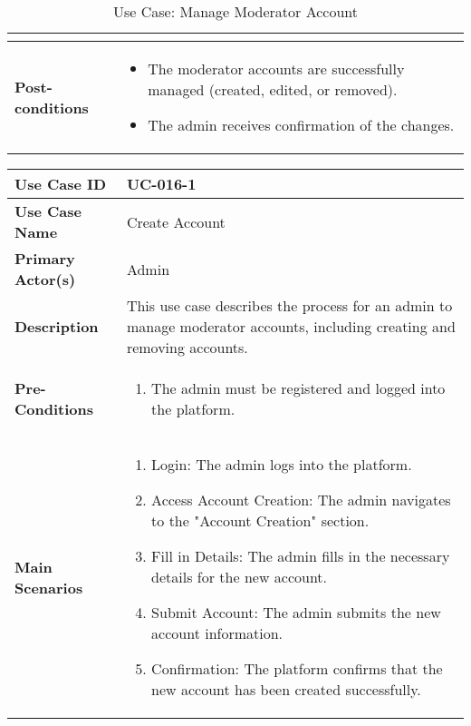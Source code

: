 \begin{table}[!ht]
\begin{tabularx}{\textwidth}{|l|X|}
\begin{itemize}[label=--,itemsep=0pt]
        \end{itemize} \\
        \hline
        \textbf{Post-conditions} & 
        \begin{itemize}[label=--,itemsep=0pt]
            \item The moderator accounts are successfully managed (created, edited, or removed).
            \item The admin receives confirmation of the changes.
        \end{itemize} \\
        \hline
    \end{tabularx}
    \caption{Use Case: Manage Moderator Account}
    \label{tab:use-case-register}
\end{table}


\begin{table}[!ht]
    \centering
    \renewcommand{\arraystretch}{1.3} %
    \begin{tabularx}{\textwidth}{|l|X|}
        \hline
        \textbf{Use Case ID} & UC-016-1 \\
        \hline
        \textbf{Use Case Name} & Create Account \\
        \hline
        \textbf{Primary Actor(s)} & Admin \\
        \hline
        \textbf{Description} & This use case describes the process for an admin to manage moderator accounts, including creating and removing accounts. \\
        \hline
        \textbf{Pre-Conditions} & 
        \begin{enumerate}[label=\arabic*.,itemsep=0pt]
            \item The admin must be registered and logged into the platform.
        \end{enumerate} \\
        \hline
        \textbf{Main Scenarios} & 
        \begin{enumerate}[label=\arabic*.,itemsep=0pt]
            \item Login: The admin logs into the platform.
            \item Access Account Creation: The admin navigates to the "Account Creation" section.
            \item Fill in Details: The admin fills in the necessary details for the new account.
            \item Submit Account: The admin submits the new account information.
            \item Confirmation: The platform confirms that the new account has been created successfully.

\end{enumerate}
\end{tabularx}
\end{table}
